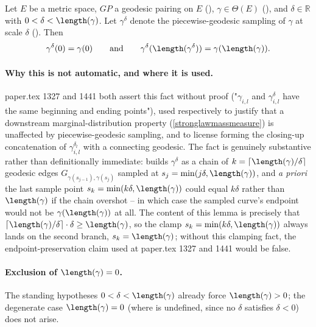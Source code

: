 \begin{lemma}
  Let $E$ be a metric space, $GP$ a geodesic pairing on $E$ (),
  $\gamma \in \Theta(E)$ (), and $\delta \in \mathbb{R}$ with $0 < \delta <
  \length(\gamma)$. Let $\gamma^\delta$ denote the piecewise-geodesic sampling of $\gamma$ at scale
  $\delta$ (). Then
  \[
    \gamma^\delta(0) = \gamma(0)
    \qquad\text{and}\qquad
    \gamma^\delta(\length(\gamma^\delta)) = \gamma(\length(\gamma))
    .
  \]

  \paragraph{Why this is not automatic, and where it is used.} paper.tex 1327 and 1441 both assert
  this fact without proof ("$\gamma_{i,l}$ and $\gamma^\delta_{i,l}$ have the same beginning and
  ending points"), used respectively to justify that a downstream marginal-distribution property
  (\eqref{stronglawmassmeasure}) is unaffected by piecewise-geodesic sampling, and to license
  forming the closing-up concatenation of $\gamma^{\delta_l}_{i,l}$ with a connecting geodesic. The
  fact is genuinely substantive rather than definitionally immediate: 
  builds $\gamma^\delta$ as a chain of $k=\lceil\length(\gamma)/\delta\rceil$ geodesic edges
  $G_{\gamma(s_{j-1}),\gamma(s_j)}$ sampled at $s_j=\min(j\delta,\length(\gamma))$, and \emph{a
  priori} the last sample point $s_k = \min(k\delta,\length(\gamma))$ could equal $k\delta$ rather
  than $\length(\gamma)$ if the chain overshot -- in which case the sampled curve's endpoint would
  not be $\gamma(\length(\gamma))$ at all. The content of this lemma is precisely that
  $\lceil\length(\gamma)/\delta\rceil \cdot \delta \ge \length(\gamma)$, so the clamp
  $s_k=\min(k\delta,\length(\gamma))$ always lands on the second branch, $s_k=\length(\gamma)$;
  without this clamping fact, the endpoint-preservation claim used at paper.tex 1327 and 1441
  would be false.

  \paragraph{Exclusion of $\length(\gamma)=0$.} The standing hypotheses $0<\delta<\length(\gamma)$
  already force $\length(\gamma) > 0$; the degenerate case $\length(\gamma)=0$ (where
   is undefined, since no $\delta$ satisfies $\delta<0$) does not arise.
\end{lemma}
